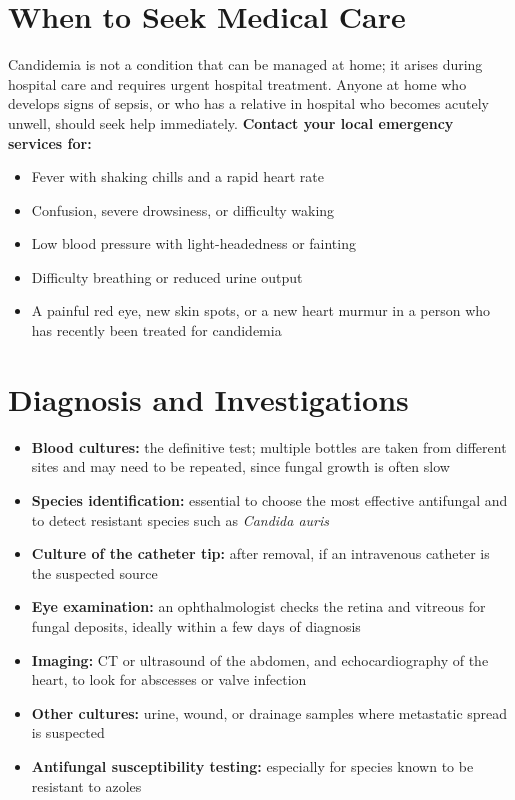 \section*{When to Seek Medical Care}
Candidemia is not a condition that can be managed at home; it arises during hospital care and requires urgent hospital treatment. Anyone at home who develops signs of sepsis, or who has a relative in hospital who becomes acutely unwell, should seek help immediately.
\textbf{Contact your local emergency services for:}
\begin{itemize}
    \item Fever with shaking chills and a rapid heart rate
    \item Confusion, severe drowsiness, or difficulty waking
    \item Low blood pressure with light-headedness or fainting
    \item Difficulty breathing or reduced urine output
    \item A painful red eye, new skin spots, or a new heart murmur in a person who has recently been treated for candidemia
\end{itemize}

\section*{Diagnosis and Investigations}
\begin{itemize}
    \item \textbf{Blood cultures:} the definitive test; multiple bottles are taken from different sites and may need to be repeated, since fungal growth is often slow
    \item \textbf{Species identification:} essential to choose the most effective antifungal and to detect resistant species such as \textit{Candida auris}
    \item \textbf{Culture of the catheter tip:} after removal, if an intravenous catheter is the suspected source
    \item \textbf{Eye examination:} an ophthalmologist checks the retina and vitreous for fungal deposits, ideally within a few days of diagnosis
    \item \textbf{Imaging:} CT or ultrasound of the abdomen, and echocardiography of the heart, to look for abscesses or valve infection
    \item \textbf{Other cultures:} urine, wound, or drainage samples where metastatic spread is suspected
    \item \textbf{Antifungal susceptibility testing:} especially for species known to be resistant to azoles
\end{itemize}

